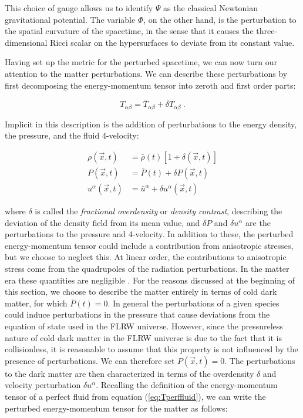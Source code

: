 \documentclass[10pt,letterpaper,final]{iopart}
\numberwithin{equation}{subsection}
\def\ni{\noindent}
\begin{document}
\ni This choice of gauge allows us to identify $\Psi$ as the classical Newtonian gravitational potential. The variable $\Phi$, on the other hand, is the perturbation to the spatial curvature of the spacetime, in the sense that it causes the three-dimensional Ricci scalar on the hypersurfaces to deviate from its constant value. 

Having set up the metric for the perturbed spacetime, we can now turn our attention to the matter perturbations. We can describe these perturbations by first decomposing the energy-momentum tensor into zeroth and first order parts:

\begin{equation}\label{eq:T_pert}
T_{\alpha \beta} = \bar{T}_{\alpha\beta} + \delta T_{\alpha\beta} \ .
\end{equation}

\ni Implicit in this description is the addition of perturbations to the energy density, the pressure, and the fluid 4-velocity:

\begin{align}
\label{eq:delta} \rho(\vec{x},t) &= \bar{\rho}(t)\left[1 +  \delta(\vec{x},t)\right] \\
P(\vec{x},t) &= \bar{P}(t) + \delta P(\vec{x},t) \\
u^{\alpha}(\vec{x},t) &= \bar{u}^{\alpha} + \delta u^{\alpha}(\vec{x},t)
\end{align}

\ni where $\delta$ is called the \emph{fractional overdensity} or \emph{density contrast}, describing the deviation of the density field from its mean value, and $\delta P$ and $\delta u^\alpha$ are the perturbations to the pressure and 4-velocity. In addition to these, the perturbed energy-momentum tensor could include a contribution from anisotropic stresses, but we choose to neglect this. At linear order, the contributions to anisotropic stress come from the quadrupoles of the radiation perturbations. In the matter era these quantities are negligible \cite{Dodelson}. For the reasons discussed at the beginning of this section, we choose to describe the matter entirely in terms of cold dark matter, for which $\bar{P}(t) = 0$. In general the perturbations of a given species could induce perturbations in the pressure that cause deviations from the equation of state used in the FLRW universe. However, since the pressureless nature of cold dark matter in the FLRW universe is due to the fact that it is collisionless, it is reasonable to assume that this property is not influenced by the presence of perturbations. We can therefore set $P(\vec{x},t) = 0$. The perturbations to the dark matter are then characterized in terms of the overdensity $\delta$ and velocity perturbation $\delta u^\alpha$. Recalling the definition of the energy-momentum tensor of a perfect fluid from equation (\ref{eq:Tperffluid}), we can write the perturbed energy-momentum tensor for the matter as follows:
\end{document}
